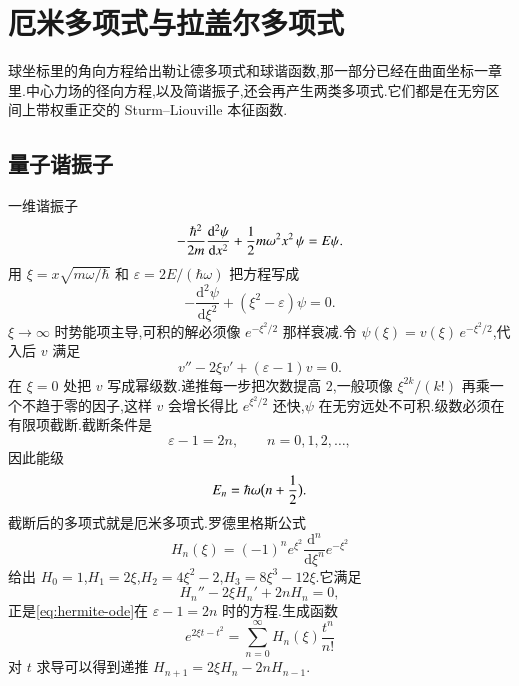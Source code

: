 \section{厄米多项式与拉盖尔多项式}
球坐标里的角向方程给出勒让德多项式和球谐函数,那一部分已经在曲面坐标一章里.中心力场的径向方程,以及简谐振子,还会再产生两类多项式.它们都是在无穷区间上带权重正交的 Sturm--Liouville 本征函数.

\subsection{量子谐振子}
一维谐振子
\begin{equation}
  -\frac{\hbar^2}{2m}\frac{\mathrm{d}^2\psi}{\mathrm{d}x^2}
  +{\frac{1}{2}} m\omega^2 x^2\,\psi
  =E\psi.
\end{equation}
用 $\xi=x\sqrt{m\omega/\hbar}$ 和 $\varepsilon=2E/(\hbar\omega)$ 把方程写成
\begin{equation}
  -\frac{\mathrm{d}^2\psi}{\mathrm{d}\xi^2}+(\xi^2-\varepsilon)\psi=0.
\end{equation}
$\xi\to\infty$ 时势能项主导,可积的解必须像 $e^{-\xi^2/2}$ 那样衰减.令 $\psi(\xi)=v(\xi)\,e^{-\xi^2/2}$,代入后 $v$ 满足
\begin{equation}
  v''-2\xi v'+(\varepsilon-1)v=0.
  \label{eq:hermite-ode}
\end{equation}
在 $\xi=0$ 处把 $v$ 写成幂级数.递推每一步把次数提高 $2$,一般项像 $\xi^{2k}/(k!)$ 再乘一个不趋于零的因子,这样 $v$ 会增长得比 $e^{\xi^2/2}$ 还快,$\psi$ 在无穷远处不可积.级数必须在有限项截断.截断条件是
\begin{equation}
  \varepsilon-1=2n, \qquad n=0,1,2,\ldots,
\end{equation}
因此能级
\begin{equation}
  E_n=\hbar\omega\bigl(n+{\frac{1}{2}}\bigr).
  \label{eq:oscillator-energy}
\end{equation}
截断后的多项式就是厄米多项式.罗德里格斯公式
\begin{equation}
  H_n(\xi)=(-1)^n e^{\xi^2}\frac{\mathrm{d}^n}{\mathrm{d}\xi^n}e^{-\xi^2}
\end{equation}
给出 $H_0=1$,$H_1=2\xi$,$H_2=4\xi^2-2$,$H_3=8\xi^3-12\xi$.它满足
\begin{equation}
  H_n''-2\xi H_n'+2n H_n=0,
\end{equation}
正是\eqref{eq:hermite-ode}在 $\varepsilon-1=2n$ 时的方程.生成函数
\begin{equation}
  e^{2\xi t-t^2}=\sum_{n=0}^{\infty} H_n(\xi)\frac{t^n}{n!}
\end{equation}
对 $t$ 求导可以得到递推 $H_{n+1}=2\xi H_n-2n H_{n-1}$.

